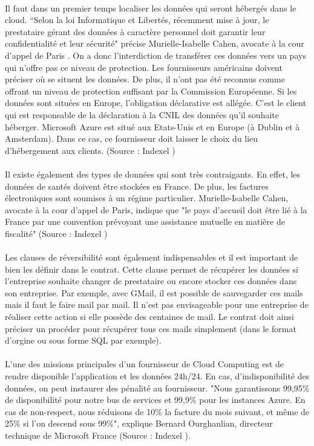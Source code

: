 \documentclass[a4paper,12pt]{report}
\begin{document}
\begin{onehalfspace}
	\paragraph*{}
	Il faut dans un premier temps localiser les données qui seront hébergés dans le cloud. “Selon la loi Informatique et Libertés, récemment mise à jour, le prestataire gérant des données à caractère personnel doit garantir leur confidentialité et leur sécurité" précise Murielle-Isabelle Cahen, avocate à la cour d'appel de Paris . On a donc l’interdiction de transférer ces données vers un pays qui n’offre pas ce niveau de protection. Les fournisseurs américains doivent préciser où se situent les données. De plus, il n’ont pas été reconnus comme offrant un niveau de protection suffisant par la Commission Européenne. Si les données sont situées en Europe, l’obligation déclarative est allégée. C’est le client qui est responsable de la déclaration à la CNIL des données qu’il souhaite héberger. Microsoft Azure est situé aux Etats-Unis et en Europe (à Dublin et à Amsterdam). Dans ce cas, ce fournisseur doit laisser le choix du lieu d’hébergement aux clients. (Source : Indexel \cite{source:indexel2})
	\paragraph*{}
	Il existe également des types de données qui sont très contraigants. En effet, les données de santés doivent être stockées en France. De plus, les factures électroniques sont soumises à un régime particulier. Murielle-Isabelle Cahen, avocate à la cour d'appel de Paris, indique que "le pays d'accueil doit être lié à la France par une convention prévoyant une assistance mutuelle en matière de fiscalité" (Source : Indexel \cite{source:indexel2})
	\paragraph*{}
	Les clauses de réversibilité sont également indispensables et il est important de bien les définir dans le contrat. Cette clause permet de récupérer les données si l’entreprise souhaite changer de prestataire ou encore stocker ces données dans son entreprise. Par exemple, avec GMail, il est possible de sauvegarder ces mails mais il faut le faire mail par mail. Il n’est pas envisageable pour une entreprise de réaliser cette action si elle possède des centaines de mail. Le contrat doit ainsi préciser un procéder pour récupérer tous ces mails simplement (dans le format d’orgine ou sous forme SQL par exemple).
	\paragraph*{}
	L’une des missions principales d’un fournisseur de Cloud Computing est de rendre disponible l’application et les données 24h/24. En cas, d’indisponibilité des données, on peut instaurer des pénalité au fournisseur. "Nous garantissons 99,95\% de disponibilité pour notre bus de services et 99,9\% pour les instances Azure. En cas de non-respect, nous réduisons de 10\% la facture du mois suivant, et même de 25\% si l'on descend sous 99\%", explique Bernard Ourghanlian, directeur technique de Microsoft France (Source : Indexel \cite{source:indexel}).

\end{onehalfspace}
\end{document}
